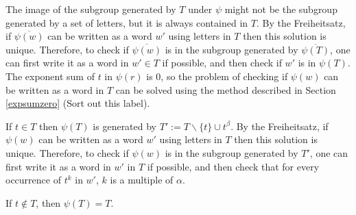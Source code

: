 \documentclass[11pt]{article} %
\theoremstyle{definition}
\theoremstyle{definition}
\theoremstyle{definition}
\theoremstyle{definition}
\theoremstyle{definition}
\newtheorem{defn}[theorem]{Definition}
\theoremstyle{definition}
\begin{document}
The image of the subgroup generated
by $T$ under $\psi$ might not be the subgroup generated by a set of letters, but it is
always contained in $T$.
By the Freiheitsatz, if $\overline{\psi(w)}$ can be written
as a word $w'$ using letters in $T$ then this solution is unique.
Therefore, to check if $\overline{\psi(w)}$ is in the subgroup generated by
$\overline{\psi(T)}$, one can first write it as a word in $w' \in T $ if possible,
and then check if $w'$ is in $\psi(T)$.
The exponent sum of $t$ in $\psi(r)$ is $0$, so the problem of checking
if $\psi(w)$ can be written as a word in $T$ can be solved using
the method described in Section \ref{expsumzero} (Sort out this label).

If $t \in T$ then $\psi(T)$ is generated by
$T' := T \backslash \{t\} \cup t^\beta$. By the Freiheitsatz, if $\psi(w)$ can be written
as a word $w'$ using letters in $T$ then this solution is unique. Therefore,
to check if $\psi(w)$ is in the subgroup generated by $T'$, one can first
write it as a word in $w'$ in $T$ if possible, and then check that for every
occurrence of $t^k$ in $w'$, $k$ is a multiple of $\alpha$.

If $t \notin T$, then  $\psi(T) = T$.






\end{document}
